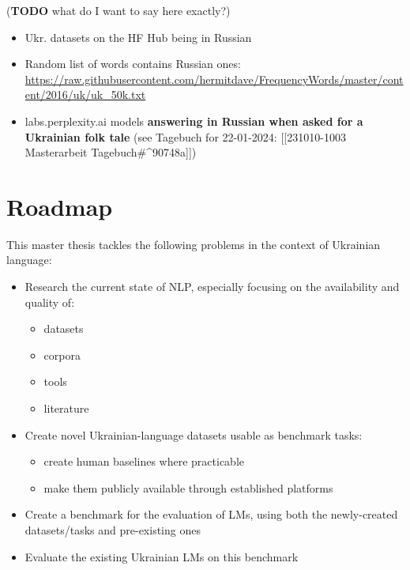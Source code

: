 (\textbf{TODO} what do I want to say here exactly?)

\begin{itemize}
\tightlist
\item
  Ukr. datasets on the HF Hub being in Russian
\item
  Random list of words contains Russian ones:
  \href{https://raw.githubusercontent.com/hermitdave/FrequencyWords/master/content/2016/uk/uk_50k.txt}{\url{https://raw.githubusercontent.com/hermitdave/FrequencyWords/master/content/2016/uk/uk_50k.txt}}
\item
  labs.perplexity.ai models \textbf{answering in Russian when asked for
  a Ukrainian folk tale} (see Tagebuch for 22-01-2024: {[}{[}231010-1003
  Masterarbeit Tagebuch\#\^{}90748a{]}{]})
\end{itemize}

\section{Roadmap}\label{roadmap}

This master thesis tackles the following problems in the context of
Ukrainian language:

\begin{itemize}
\tightlist
\item
  Research the current state of NLP, especially focusing on the
  availability and quality of:

  \begin{itemize}
  \tightlist
  \item
    datasets
  \item
    corpora
  \item
    tools
  \item
    literature
  \end{itemize}
\item
  Create novel Ukrainian-language datasets usable as benchmark tasks:

  \begin{itemize}
  \tightlist
  \item
    create human baselines where practicable
  \item
    make them publicly available through established platforms
  \end{itemize}
\item
  Create a benchmark for the evaluation of LMs, using both the
  newly-created datasets/tasks and pre-existing ones
\item
  Evaluate the existing Ukrainian LMs on this benchmark
\end{itemize}

